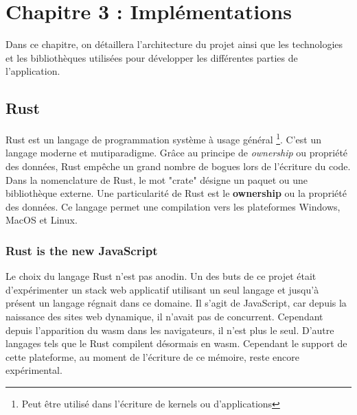 \chapter{Chapitre 3 : Implémentations}

Dans ce chapitre, on détaillera l'architecture du projet 
ainsi que les technologies et les bibliothèques utilisées
pour développer les différentes parties de l'application.


\section{Rust}

Rust est un langage de programmation système à usage général \footnote{Peut être
utilisé dans l'écriture de kernels ou d'applications}. C'est un langage moderne
et mutiparadigme.
Grâce au principe de \textit{ownership} ou propriété des données, Rust empêche un grand nombre de
bogues lors de l'écriture du code. 
Dans la nomenclature de Rust, le mot "crate" désigne un paquet ou une bibliothèque
externe.
Une particularité de Rust est le \textbf{ownership} ou la propriété des données.
Ce langage permet une compilation vers les plateformes Windows, MacOS et Linux.

\subsection{Rust is the new JavaScript} 

Le choix du langage Rust n'est pas anodin.
Un des buts de ce projet était d'expérimenter un stack
web applicatif utilisant un seul langage et jusqu'à présent un langage régnait dans ce domaine.
Il s'agit de JavaScript, car depuis la naissance des sites web dynamique, il
n'avait pas de concurrent.
Cependant depuis l'apparition du \gls{wasm} dans les navigateurs, il n'est plus
le seul. D'autre langages tels que le Rust compilent désormais en \gls{wasm}.
Cependant le support de cette plateforme, au moment de l'écriture de ce mémoire,
reste encore expérimental.


